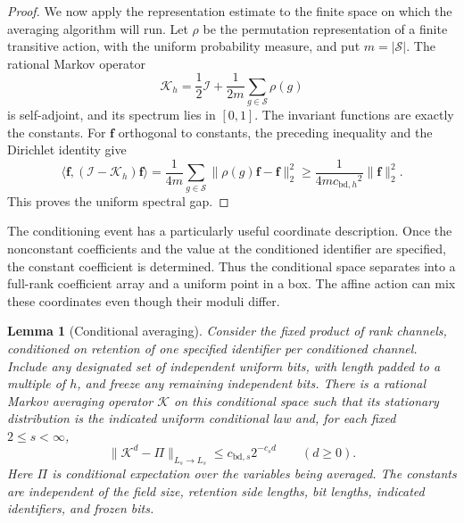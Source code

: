 \documentclass[11pt]{article}
\numberwithin{equation}{section}
\newtheorem{lemma}[theorem]{Lemma}
\theoremstyle{definition}
\theoremstyle{remark}
\begin{document}
\begin{proof}
We now apply the representation estimate to the finite space on which the averaging algorithm will run. Let $\rho$ be the permutation representation of a finite transitive
action, with the uniform probability measure, and put $m=|\mathcal S|$.
The rational Markov operator
\[
{\mathcal{K}}_{h}=\frac12{\mathcal{I}}+\frac1{2m}\sum_{g\in\mathcal S}\rho(g)
\]
is self-adjoint, and its spectrum lies in $[0,1]$. The invariant
functions are exactly the constants. For ${\mathbf{f}}$ orthogonal to constants,
the preceding inequality and the Dirichlet identity give
\[
\langle {\mathbf{f}},({\mathcal{I}}-{\mathcal{K}}_{h}){\mathbf{f}}\rangle
=\frac1{4m}\sum_{g\in\mathcal S}\|\rho(g){\mathbf{f}}-{\mathbf{f}}\|_2^2
\ge\frac1{4m{c_{\mathrm{bd},h}}^2}\|{\mathbf{f}}\|_2^2.
\]
This proves the uniform spectral gap.
\end{proof}

The conditioning event has a particularly useful coordinate description. Once the nonconstant coefficients and the value at the conditioned identifier are specified, the constant coefficient is determined. Thus the conditional space separates into a full-rank coefficient array and a uniform point in a box. The affine action can mix these coordinates even though their moduli differ.

\begin{lemma}[Conditional averaging]\label{lem:env-gap}
Consider the fixed product of rank channels, conditioned on retention of
one specified identifier per conditioned channel. Include any designated
set of independent uniform bits, with length padded to a multiple of
${h}$, and freeze any remaining independent bits.
There is a rational Markov averaging operator ${\mathcal{K}}$ on this conditional
space such that its stationary distribution is the indicated uniform
conditional law and, for each fixed $2\le s<\infty$,
\[
\|{\mathcal{K}}^d-\Pi\|_{L_s\to L_s}\le {c_{\mathrm{bd},s}}2^{-c_sd}
\qquad(d\ge0).
\]
Here $\Pi$ is conditional expectation over the variables being averaged.
The constants are independent of the field size, retention side
lengths, bit lengths, indicated identifiers, and frozen bits.
\end{lemma}
\end{document}
